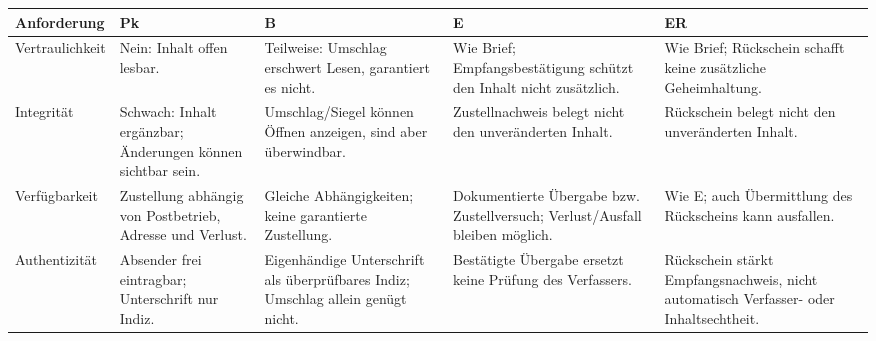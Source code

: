 \documentclass[a4paper,11pt]{article}
\newif\ifexplain
\newcommand{\explain}[1]{\ifexplain\begin{erklbox}#1\end{erklbox}\fi}
\begin{document}
{\footnotesize
\begin{tabularx}{\linewidth}{>{\RaggedRight\arraybackslash}p{2.2cm}YYYY}
\toprule
Anforderung & Pk & B & E & ER\\ \midrule
Vertraulichkeit & Nein: Inhalt offen lesbar. & Teilweise: Umschlag erschwert Lesen, garantiert es nicht. & Wie Brief; Empfangsbestätigung schützt den Inhalt nicht zusätzlich. & Wie Brief; Rückschein schafft keine zusätzliche Geheimhaltung.\\
Integrität & Schwach: Inhalt ergänzbar; Änderungen können sichtbar sein. & Umschlag/Siegel können Öffnen anzeigen, sind aber überwindbar. & Zustellnachweis belegt nicht den unveränderten Inhalt. & Rückschein belegt nicht den unveränderten Inhalt.\\
Verfügbarkeit & Zustellung abhängig von Postbetrieb, Adresse und Verlust. & Gleiche Abhängigkeiten; keine garantierte Zustellung. & Dokumentierte Übergabe bzw. Zustellversuch; Verlust/Ausfall bleiben möglich. & Wie E; auch Übermittlung des Rückscheins kann ausfallen.\\
Authentizität & Absender frei eintragbar; Unterschrift nur Indiz. & Eigenhändige Unterschrift als überprüfbares Indiz; Umschlag allein genügt nicht. & Bestätigte Übergabe ersetzt keine Prüfung des Verfassers. & Rückschein stärkt Empfangsnachweis, nicht automatisch Verfasser- oder Inhaltsechtheit.\\ \bottomrule
\end{tabularx}}\par
\explain{Ein Einschreiben löst vor allem eine Nachweisfrage. Es macht den Inhalt nicht automatisch
geheim oder unveränderbar. Auch ein leerer Umschlag kann eingeschrieben zugestellt werden;
deshalb müssen Empfang des Umschlags und Nachweis seines Inhalts getrennt werden.}
\end{document}
